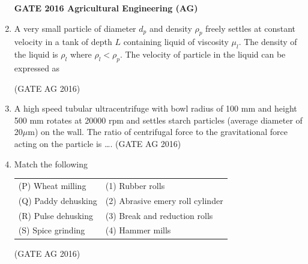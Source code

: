 \documentclass[journal]{IEEEtran}
\begin{document}
\begin{enumerate}
\medskip

\noindent
\textbf{GATE 2016 Agricultural Engineering (AG)}

\item 
A very small particle of diameter $d_p$ and density $\rho_p$ freely settles at constant velocity in a tank of depth $L$ containing liquid of viscosity $\mu_l$. The density of the liquid is $\rho_l$ where $\rho_l < \rho_p$. The velocity of particle in the liquid can be expressed as
\begin{enumerate}
\end{enumerate}
\hfill(GATE AG 2016)\\

\medskip

\item 
A high speed tubular ultracentrifuge with bowl radius of 100 mm and height 500 mm rotates at 20000 rpm and settles starch particles (average diameter of 20$\mu$m) on the wall. The ratio of centrifugal force to the gravitational force acting on the particle is \dots.
\hfill(GATE AG 2016)\\

\item Match the following

\begin{tabular}{ll}
(P) Wheat milling     & (1) Rubber rolls \\
(Q) Paddy dehusking  & (2) Abrasive emery roll cylinder \\
(R) Pulse dehusking  & (3) Break and reduction rolls \\
(S) Spice grinding   & (4) Hammer mills \\
\end{tabular}

\begin{enumerate}
\end{enumerate}
\hfill(GATE AG 2016)\\


\end{enumerate}
\end{document}
